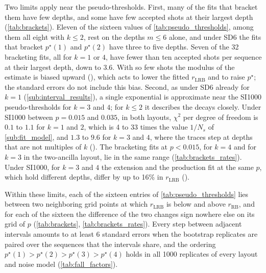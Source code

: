Two limits apply near the pseudo-thresholds. First, many of the fits that bracket them have few depths, and some have few accepted shots at their largest depth (\autoref{tab:brackets}). Eleven of the sixteen values of \autoref{tab:pseudo_thresholds}, among them all eight with $k \le 2$, rest on the depths $m \le 6$ alone, and under SD6 the fits that bracket $p^\star(1)$ and $p^\star(2)$ have three to five depths. Seven of the 32 bracketing fits, all for $k = 1$ or $4$, have fewer than ten accepted shots per sequence at their largest depth, down to $3.6$. With so few shots the modulus of the estimate is biased upward (), which acts to lower the fitted $r_{\mathrm{LRB}}$ and to raise $p^\star$; the standard errors do not include this bias. Second, as under SD6 already for $k = 1$ (\autoref{sub:interval_results}), a single exponential is approximate near the SI1000 pseudo-thresholds for $k = 3$ and $4$; for $k \le 2$ it describes the decays closely. Under SI1000 between $p = 0.015$ and $0.035$, in both layouts, $\chi^2$ per degree of freedom is $0.1$ to $1.1$ for $k = 1$ and $2$, which is 4 to 33 times the value $1/N_s$ of \autoref{sub:fit_model}, and $1.3$ to $9.6$ for $k = 3$ and $4$, where the traces step at depths that are not multiples of $k$ (). The bracketing fits at $p < 0.015$, for $k = 4$ and for $k = 3$ in the two-ancilla layout, lie in the same range (\autoref{tab:brackets_rates}). Under SI1000, for $k = 3$ and $4$ the extension and the production fit at the same $p$, which hold different depths, differ by up to 16\% in $r_{\mathrm{LRB}}$ ().

Within these limits, each of the sixteen entries of \autoref{tab:pseudo_thresholds} lies between two neighboring grid points at which $r_{\mathrm{LRB}}$ is below and above $r_{\mathrm{RB}}$, and for each of the sixteen the difference of the two changes sign nowhere else on its grid of $p$ (\autoref{tab:brackets}, \autoref{tab:brackets_rates}). Every step between adjacent intervals amounts to at least 6 standard errors when the bootstrap replicates are paired over the sequences that the intervals share, and the ordering $p^\star(1) > p^\star(2) > p^\star(3) > p^\star(4)$ holds in all 1000 replicates of every layout and noise model (\autoref{tab:fall_factors}).

